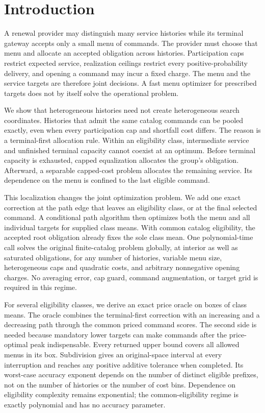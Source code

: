 \section{Introduction}
A renewal provider may distinguish many service histories while its terminal gateway accepts only a small menu of commands. The provider must choose that menu and allocate an accepted obligation across histories. Participation caps restrict expected service, realization ceilings restrict every positive-probability delivery, and opening a command may incur a fixed charge. The menu and the service targets are therefore joint decisions. A fast menu optimizer for prescribed targets does not by itself solve the operational problem.

We show that heterogeneous histories need not create heterogeneous search coordinates. Histories that admit the same catalog commands can be pooled exactly, even when every participation cap and shortfall cost differs. The reason is a terminal-first allocation rule. Within an eligibility class, intermediate service and unfinished terminal capacity cannot coexist at an optimum. Before terminal capacity is exhausted, capped equalization allocates the group's obligation. Afterward, a separable capped-cost problem allocates the remaining service. Its dependence on the menu is confined to the last eligible command.

This localization changes the joint optimization problem. We add one exact correction at the path edge that leaves an eligibility class, or at the final selected command. A conditional path algorithm then optimizes both the menu and all individual targets for supplied class means. With common catalog eligibility, the accepted root obligation already fixes the sole class mean. One polynomial-time call solves the original finite-catalog problem globally, at interior as well as saturated obligations, for any number of histories, variable menu size, heterogeneous caps and quadratic costs, and arbitrary nonnegative opening charges. No averaging error, cap guard, command augmentation, or target grid is required in this regime.

For several eligibility classes, we derive an exact price oracle on boxes of class means. The oracle combines the terminal-first correction with an increasing and a decreasing path through the common priced command scores. The second side is needed because mandatory lower targets can make commands after the price-optimal peak indispensable. Every returned upper bound covers all allowed menus in its box. Subdivision gives an original-space interval at every interruption and reaches any positive additive tolerance when completed. Its worst-case accuracy exponent depends on the number of distinct eligible prefixes, not on the number of histories or the number of cost bins. Dependence on eligibility complexity remains exponential; the common-eligibility regime is exactly polynomial and has no accuracy parameter.


